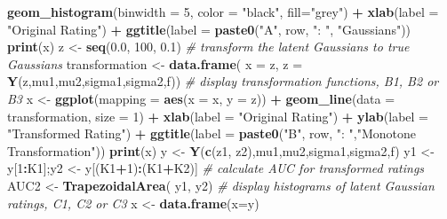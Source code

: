 \documentclass[
]{book}
\newenvironment{Shaded}{\begin{snugshade}}{\end{snugshade}}
\newcommand{\CommentTok}[1]{\textcolor[rgb]{0.56,0.35,0.01}{\textit{#1}}}
\newcommand{\DataTypeTok}[1]{\textcolor[rgb]{0.13,0.29,0.53}{#1}}
\newcommand{\DecValTok}[1]{\textcolor[rgb]{0.00,0.00,0.81}{#1}}
\newcommand{\FloatTok}[1]{\textcolor[rgb]{0.00,0.00,0.81}{#1}}
\newcommand{\KeywordTok}[1]{\textcolor[rgb]{0.13,0.29,0.53}{\textbf{#1}}}
\newcommand{\NormalTok}[1]{#1}
\newcommand{\OperatorTok}[1]{\textcolor[rgb]{0.81,0.36,0.00}{\textbf{#1}}}
\newcommand{\StringTok}[1]{\textcolor[rgb]{0.31,0.60,0.02}{#1}}
\begin{document}
\begin{Shaded}
\begin{Highlighting}[]
\StringTok{    }\KeywordTok{geom_histogram}\NormalTok{(}\DataTypeTok{binwidth =} \DecValTok{5}\NormalTok{, }\DataTypeTok{color =} \StringTok{"black"}\NormalTok{, }\DataTypeTok{fill=}\StringTok{"grey"}\NormalTok{) }\OperatorTok{+}\StringTok{ }
\StringTok{    }\KeywordTok{xlab}\NormalTok{(}\DataTypeTok{label =} \StringTok{"Original Rating"}\NormalTok{) }\OperatorTok{+}\StringTok{ }
\StringTok{    }\KeywordTok{ggtitle}\NormalTok{(}\DataTypeTok{label =} \KeywordTok{paste0}\NormalTok{(}\StringTok{"A"}\NormalTok{, row, }\StringTok{": "}\NormalTok{, }\StringTok{"Gaussians"}\NormalTok{))}
  \KeywordTok{print}\NormalTok{(x)}
\NormalTok{  z <-}\StringTok{ }\KeywordTok{seq}\NormalTok{(}\FloatTok{0.0}\NormalTok{, }\DecValTok{100}\NormalTok{, }\FloatTok{0.1}\NormalTok{)}
  \CommentTok{# transform the latent Gaussians to true Gaussians}
\NormalTok{  transformation <-}\StringTok{ }
\StringTok{    }\KeywordTok{data.frame}\NormalTok{(}
      \DataTypeTok{x =}\NormalTok{ z, }
      \DataTypeTok{z =}  \KeywordTok{Y}\NormalTok{(z,mu1,mu2,sigma1,sigma2,f))}
  \CommentTok{# display transformation functions, B1, B2 or B3}
\NormalTok{  x <-}\StringTok{ }
\StringTok{    }\KeywordTok{ggplot}\NormalTok{(}\DataTypeTok{mapping =} \KeywordTok{aes}\NormalTok{(}\DataTypeTok{x =}\NormalTok{ x, }\DataTypeTok{y =}\NormalTok{ z)) }\OperatorTok{+}\StringTok{ }
\StringTok{    }\KeywordTok{geom_line}\NormalTok{(}\DataTypeTok{data =}\NormalTok{ transformation, }\DataTypeTok{size =} \DecValTok{1}\NormalTok{) }\OperatorTok{+}
\StringTok{    }\KeywordTok{xlab}\NormalTok{(}\DataTypeTok{label =} \StringTok{"Original Rating"}\NormalTok{) }\OperatorTok{+}
\StringTok{    }\KeywordTok{ylab}\NormalTok{(}\DataTypeTok{label =} \StringTok{"Transformed Rating"}\NormalTok{) }\OperatorTok{+}\StringTok{ }
\StringTok{    }\KeywordTok{ggtitle}\NormalTok{(}\DataTypeTok{label =} \KeywordTok{paste0}\NormalTok{(}\StringTok{"B"}\NormalTok{, row, }\StringTok{": "}\NormalTok{,}\StringTok{"Monotone Transformation"}\NormalTok{))}
  \KeywordTok{print}\NormalTok{(x)}
\NormalTok{  y <-}\StringTok{ }\KeywordTok{Y}\NormalTok{(}\KeywordTok{c}\NormalTok{(z1, z2),mu1,mu2,sigma1,sigma2,f)}
\NormalTok{  y1 <-}\StringTok{ }\NormalTok{y[}\DecValTok{1}\OperatorTok{:}\NormalTok{K1];y2 <-}\StringTok{ }\NormalTok{y[(K1}\OperatorTok{+}\DecValTok{1}\NormalTok{)}\OperatorTok{:}\NormalTok{(K1}\OperatorTok{+}\NormalTok{K2)]}
  \CommentTok{# calculate AUC for transformed ratings}
\NormalTok{  AUC2 <-}\StringTok{ }\KeywordTok{TrapezoidalArea}\NormalTok{( y1, y2)}
  \CommentTok{# display histograms of latent Gaussian ratings, C1, C2 or C3}
\NormalTok{  x <-}\StringTok{ }\KeywordTok{data.frame}\NormalTok{(}\DataTypeTok{x=}\NormalTok{y)}

\end{Highlighting}
\end{Shaded}
\end{document}
